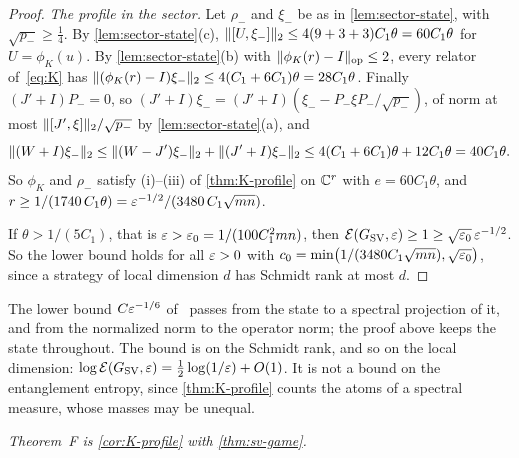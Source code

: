 \begin{proof}
\emph{The profile in the sector.} Let $\rho_-$ and $\xi_-$ be as in \cref{lem:sector-state}, with $\sqrt{p_-}\ge\frac14$. By
\cref{lem:sector-state}(c), $\lVert [U,\xi_-]\rVert_2\le4(9+3+3)C_1\theta=60C_1\theta$ for $U=\phi_K(u)$. By \cref{lem:sector-state}(b) with
$\lVert \phi_K(r)-I\rVert_{\mathrm{op}}\le2$, every relator of~\eqref{eq:K} has $\lVert (\phi_K(r)-I)\xi_-\rVert_2\le4(C_1+6C_1)\theta=28C_1\theta$. Finally $(J'+I)P_-=0$,
so $(J'+I)\xi_-=(J'+I)(\xi_--P_-\xi P_-/\sqrt{p_-})$, of norm at most $\lVert [J',\xi]\rVert_2/\sqrt{p_-}$ by \cref{lem:sector-state}(a), and
\[
\lVert (W+I)\xi_-\rVert_2\le\lVert (W-J')\xi_-\rVert_2+\lVert (J'+I)\xi_-\rVert_2\le4(C_1+6C_1)\theta+12C_1\theta=40C_1\theta .
\]
So $\phi_K$ and $\rho_-$ satisfy (i)--(iii) of \cref{thm:K-profile} on $\mathbb C^r$ with $e=60C_1\theta$, and
$r\ge1/(1740\,C_1\theta)=\varepsilon^{-1/2}/(3480\,C_1\sqrt{mn})$.

If $\theta>1/(5C_1)$, that is $\varepsilon>\varepsilon_0=1/(100C_1^2mn)$, then $\mathcal E(G_{\mathrm{SV}},\varepsilon)\ge1\ge\sqrt{\varepsilon_0}\,\varepsilon^{-1/2}$. So the lower bound
holds for all $\varepsilon>0$ with $c_0=\min\bigl(1/(3480C_1\sqrt{mn}),\sqrt{\varepsilon_0}\bigr)$, since a strategy of local dimension $d$ has Schmidt rank
at most $d$.
\end{proof}

\begin{remark}\label{rates:rem-sv}
The lower bound $C\varepsilon^{-1/6}$ of~\cite[Theorem~1.1]{SV18} passes from the state to a spectral projection of it, and from the
normalized norm to the operator norm; the proof above keeps the state throughout. The bound is on the Schmidt rank, and so on the local
dimension: $\log\mathcal E(G_{\mathrm{SV}},\varepsilon)=\frac12\log(1/\varepsilon)+O(1)$. It is not a bound on the entanglement entropy, since \cref{thm:K-profile} counts
the atoms of a spectral measure, whose masses may be unequal.
\end{remark}

\emph{Theorem~F is \cref{cor:K-profile} with \cref{thm:sv-game}.}
